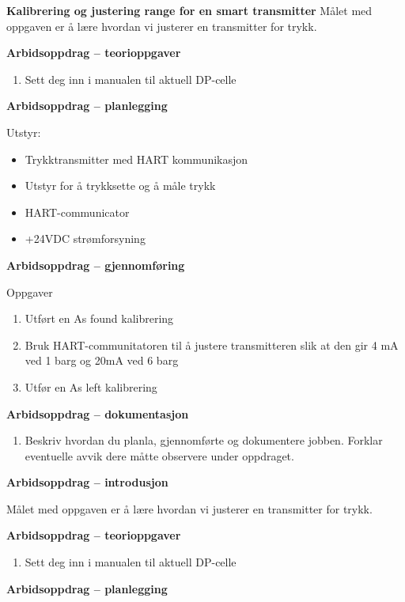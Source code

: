 \textbf{Kalibrering og justering range for en smart transmitter}
Målet med oppgaven er å lære hvordan vi justerer en transmitter for trykk.



\textbf{Arbidsoppdrag -- teorioppgaver}

\begin{enumerate}
	\item Sett deg inn i manualen til aktuell DP-celle
\end{enumerate}
\textbf{Arbidsoppdrag -- planlegging}

Utstyr:
\begin{itemize}[noitemsep]
	\item Trykktransmitter med HART kommunikasjon 
	\item Utstyr for å trykksette og å måle trykk 
	\item HART-communicator 
	\item +24VDC strømforsyning 
\end{itemize}

\textbf{Arbidsoppdrag -- gjennomføring}

Oppgaver\begin{enumerate}
	\item		Utført en As found kalibrering 
	\item		Bruk HART-communitatoren til å justere transmitteren slik at den gir 4 mA ved 1 barg og 20mA ved 6 barg 
	\item		Utfør en As left kalibrering 
\end{enumerate}
\textbf{Arbidsoppdrag -- dokumentasjon}

\begin{enumerate}
	\item Beskriv hvordan du planla, gjennomførte og dokumentere jobben. Forklar eventuelle avvik dere måtte observere under oppdraget. 
\end{enumerate}



\textbf{Arbidsoppdrag -- introdusjon}

Målet med oppgaven er å lære hvordan vi justerer en transmitter for trykk.



\textbf{Arbidsoppdrag -- teorioppgaver}

\begin{enumerate}
	\item Sett deg inn i manualen til aktuell DP-celle
\end{enumerate}
\textbf{Arbidsoppdrag -- planlegging}

